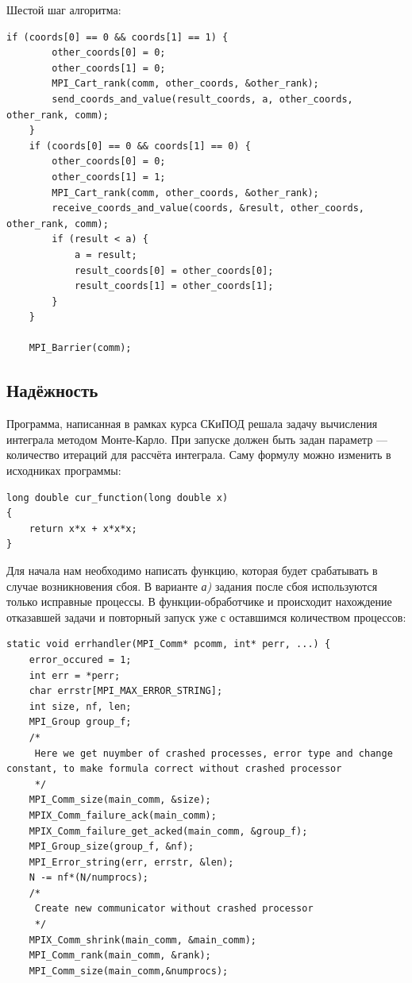 \documentclass[a4paper]{article}
\begin{document}
\newpage
Шестой шаг алгоритма:
\begin{lstlisting}
if (coords[0] == 0 && coords[1] == 1) {
        other_coords[0] = 0;
        other_coords[1] = 0;
        MPI_Cart_rank(comm, other_coords, &other_rank);
        send_coords_and_value(result_coords, a, other_coords, other_rank, comm);
    }
    if (coords[0] == 0 && coords[1] == 0) {
        other_coords[0] = 0;
        other_coords[1] = 1;
        MPI_Cart_rank(comm, other_coords, &other_rank);
        receive_coords_and_value(coords, &result, other_coords, other_rank, comm);
        if (result < a) {
            a = result;
            result_coords[0] = other_coords[0];
            result_coords[1] = other_coords[1];
        }
    }
    
    MPI_Barrier(comm);
\end{lstlisting}


\newpage
\subsection{Надёжность}
Программа, написанная в рамках курса СКиПОД решала задачу вычисления интеграла методом Монте-Карло. 
При запуске должен быть задан параметр --- количество итераций для рассчёта интеграла. Саму формулу можно изменить в исходниках программы:

\begin{lstlisting}
long double cur_function(long double x)
{
    return x*x + x*x*x;
}

\end{lstlisting}


 Для начала нам необходимо написать функцию, которая будет срабатывать в случае возникновения сбоя. В варианте \textit{а)} задания после сбоя используются только исправные процессы. В  функции-обработчике и происходит нахождение отказавшей задачи и повторный запуск уже с оставшимся количеством процессов:

\begin{lstlisting}
static void errhandler(MPI_Comm* pcomm, int* perr, ...) {
    error_occured = 1;
    int err = *perr;
    char errstr[MPI_MAX_ERROR_STRING];
    int size, nf, len;
    MPI_Group group_f;
    /*
     Here we get nuymber of crashed processes, error type and change constant, to make formula correct without crashed processor
     */
    MPI_Comm_size(main_comm, &size);
    MPIX_Comm_failure_ack(main_comm);
    MPIX_Comm_failure_get_acked(main_comm, &group_f);
    MPI_Group_size(group_f, &nf);
    MPI_Error_string(err, errstr, &len);
    N -= nf*(N/numprocs);
    /*
     Create new communicator without crashed processor
     */
    MPIX_Comm_shrink(main_comm, &main_comm);
    MPI_Comm_rank(main_comm, &rank);
    MPI_Comm_size(main_comm,&numprocs);

\end{lstlisting}
\end{document}
